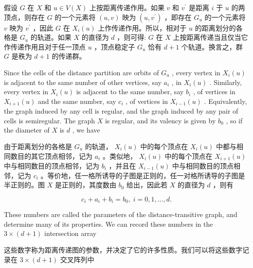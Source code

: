 \documentclass[10pt]{article}
\begin{document}
\begin{tcolorbox}\relax
假设 \(G\) 在 \(X\) 和 \(u \in  V\left( X\right)\) 上按距离传递作用。如果 \(v\) 和 \({v}^{\prime }\) 是距离 \(i\) 于 \(u\) 的两顶点，则存在 \(G\) 的一个元素将 \(\left( {u,v}\right)\) 映为 \(\left( {u,{v}^{\prime }}\right)\) ，即存在 \({G}_{u}\) 的一个元素将 \(v\) 映为 \({v}^{\prime }\) ，因此 \(G\) 在 \({X}_{i}\left( u\right)\) 上作传递作用。所以，相对于 \(u\) 的距离划分的各格是 \({G}_{u}\) 的轨道。如果 \(X\) 的直径为 \(d\) ，则可得: \(G\) 在 \(X\) 上按距离传递当且仅当它作传递作用且对于任一顶点 \(u\) ，顶点稳定子 \({G}_{u}\) 恰有 \(d + 1\) 个轨道。换言之，群 \(G\) 是秩为 \(d + 1\) 的传递群。
\end{tcolorbox}

Since the cells of the distance partition are orbits of \({G}_{u}\) , every vertex in \({X}_{i}\left( u\right)\) is adjacent to the same number of other vertices, say \({a}_{i}\) , in \({X}_{i}\left( u\right)\) . Similarly, every vertex in \({X}_{i}\left( u\right)\) is adjacent to the same number, say \({b}_{i}\) , of vertices in \({X}_{i + 1}\left( u\right)\) and the same number, say \({c}_{i}\) , of vertices in \({X}_{i - 1}\left( u\right)\) . Equivalently, the graph induced by any cell is regular, and the graph induced by any pair of cells is semiregular. The graph \(X\) is regular, and its valency is given by \({b}_{0}\) , so if the diameter of \(X\) is \(d\) , we have

\begin{tcolorbox}\relax
由于距离划分的各格是 \({G}_{u}\) 的轨道， \({X}_{i}\left( u\right)\) 中的每个顶点在 \({X}_{i}\left( u\right)\) 中都与相同数目的其它顶点相邻，记为 \({a}_{i}\) 。类似地， \({X}_{i}\left( u\right)\) 中的每个顶点在 \({X}_{i + 1}\left( u\right)\) 中与相同数目的顶点相邻，记为 \({b}_{i}\) ，并且在 \({X}_{i - 1}\left( u\right)\) 中与相同数目的顶点相邻，记为 \({c}_{i}\) 。等价地，任一格所诱导的子图是正则的，任一对格所诱导的子图是半正则的。图 \(X\) 是正则的，其度数由 \({b}_{0}\) 给出，因此若 \(X\) 的直径为 \(d\) ，则有
\end{tcolorbox}

\[
{c}_{i} + {a}_{i} + {b}_{i} = {b}_{0},\;i = 0,1,\ldots ,d.
\]

These numbers are called the parameters of the distance-transitive graph, and determine many of its properties. We can record these numbers in the \(3 \times  \left( {d + 1}\right)\) intersection array

\begin{tcolorbox}\relax
这些数字称为距离传递图的参数，并决定了它的许多性质。我们可以将这些数字记录在 \(3 \times  \left( {d + 1}\right)\) 交叉阵列中
\end{tcolorbox}
\end{document}
